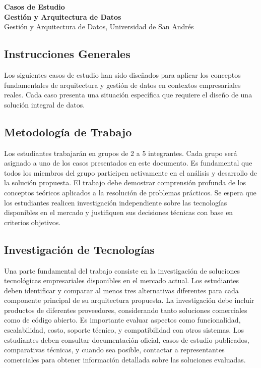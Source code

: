 \documentclass[12pt]{article}
\begin{document}
\begin{center}
  {\LARGE \textbf{Casos de Estudio\\ Gestión y Arquitectura de Datos}}\\[0.5em]
  {Gestión y Arquitectura de Datos, Universidad de San Andrés}
\end{center}

\subsection*{Instrucciones Generales}

Los siguientes casos de estudio han sido diseñados para aplicar los conceptos fundamentales de arquitectura y gestión de datos en contextos empresariales reales. Cada caso presenta una situación específica que requiere el diseño de una solución integral de datos.

\subsection*{Metodología de Trabajo}

Los estudiantes trabajarán en grupos de 2 a 5 integrantes. Cada grupo será asignado a uno de los casos presentados en este documento. Es fundamental que todos los miembros del grupo participen activamente en el análisis y desarrollo de la solución propuesta. El trabajo debe demostrar comprensión profunda de los conceptos teóricos aplicados a la resolución de problemas prácticos. Se espera que los estudiantes realicen investigación independiente sobre las tecnologías disponibles en el mercado y justifiquen sus decisiones técnicas con base en criterios objetivos.

\subsection*{Investigación de Tecnologías}

Una parte fundamental del trabajo consiste en la investigación de soluciones tecnológicas empresariales disponibles en el mercado actual. Los estudiantes deben identificar y comparar al menos tres alternativas diferentes para cada componente principal de su arquitectura propuesta. La investigación debe incluir productos de diferentes proveedores, considerando tanto soluciones comerciales como de código abierto. Es importante evaluar aspectos como funcionalidad, escalabilidad, costo, soporte técnico, y compatibilidad con otros sistemas. Los estudiantes deben consultar documentación oficial, casos de estudio publicados, comparativas técnicas, y cuando sea posible, contactar a representantes comerciales para obtener información detallada sobre las soluciones evaluadas.
\end{document}
